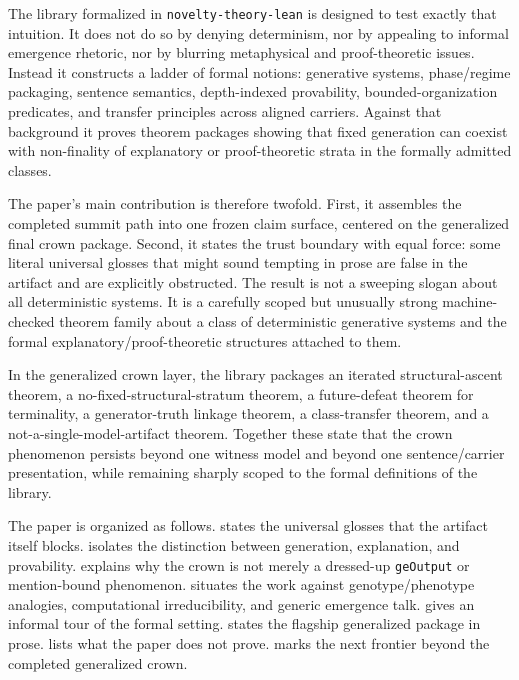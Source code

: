 \documentclass[11pt,a4paper]{article}
\newenvironment{keybox}[1]{%
  \Needspace*{8\baselineskip}%
  \begin{tcolorbox}[
    enhanced, breakable=false,
    colback=blue!5, colframe=blue!45!black, coltitle=black,
    colbacktitle=blue!14, boxrule=0.85pt, arc=2.5pt,
    left=9pt, right=9pt, top=6pt, bottom=6pt,
    titlerule=0.55pt, fonttitle=\bfseries, title={#1},
    before upper=\raggedright,
    before skip=0.9\baselineskip, after skip=0.9\baselineskip
  ]%
}{%
  \end{tcolorbox}%
}
\theoremstyle{definition}
\begin{document}
The library formalized in \texttt{novelty-theory-lean} is designed to test exactly that intuition. It does not do so by denying determinism, nor by appealing to informal emergence rhetoric, nor by blurring metaphysical and proof-theoretic issues. Instead it constructs a ladder of formal notions: generative systems, phase/regime packaging, sentence semantics, depth-indexed provability, bounded-organization predicates, and transfer principles across aligned carriers. Against that background it proves theorem packages showing that fixed generation can coexist with non-finality of explanatory or proof-theoretic strata in the formally admitted classes.

The paper's main contribution is therefore twofold. First, it assembles the completed summit path into one frozen claim surface, centered on the generalized final crown package. Second, it states the trust boundary with equal force: some literal universal glosses that might sound tempting in prose are false in the artifact and are explicitly obstructed. The result is not a sweeping slogan about all deterministic systems. It is a carefully scoped but unusually strong machine-checked theorem family about a class of deterministic generative systems and the formal explanatory/proof-theoretic structures attached to them.

\begin{keybox}{Flagship theorem shape}
In the generalized crown layer, the library packages an iterated structural-ascent theorem, a no-fixed-structural-stratum theorem, a future-defeat theorem for terminality, a generator-truth linkage theorem, a class-transfer theorem, and a not-a-single-model-artifact theorem. Together these state that the crown phenomenon persists beyond one witness model and beyond one sentence/carrier presentation, while remaining sharply scoped to the formal definitions of the library.
\end{keybox}

The paper is organized as follows.  states the universal glosses that the artifact itself blocks.  isolates the distinction between generation, explanation, and provability.  explains why the crown is not merely a dressed-up \texttt{geOutput} or mention-bound phenomenon.  situates the work against genotype/phenotype analogies, computational irreducibility, and generic emergence talk.  gives an informal tour of the formal setting.  states the flagship generalized package in prose.  lists what the paper does not prove.  marks the next frontier beyond the completed generalized crown.
\end{document}
